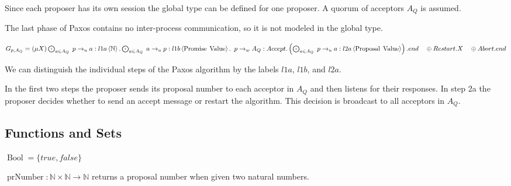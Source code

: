 \newcommand{\Mu}[1]{\left(\mu #1\right)}

\newcommand{\Paren}[1]{\left(#1\right)}

Since each proposer has its own session the global type can be defined for one proposer.
A quorum of acceptors $A_Q$ is assumed.

The last phase of Paxos contains no inter-process communication, so it is not modeled in the global type.

$G_{p, A_Q} = \Mu{X} \DotForall{a \in A_Q} \SendUnreliableG{p}{a}{l1a}{\mathbb{N}} . \DotForall{a \in A_Q} \SendUnreliableG{a}{p}{l1b}{\Promise{\Value}} .\\
\hspace*{0.5em}\SendWeaklyG{p}{A_Q}{\Accept.\Paren{\DotForall{a \in A_Q} \SendUnreliableG{p}{a}{l2a}{\Proposal{\Value}}}.end\\
\hspace*{1em}\oplus \Restart.X\\
\hspace*{1em}\oplus \Abort.end}$

We can distinguish the individual steps of the Paxos algorithm by the labels $l1a$, $l1b$, and $l2a$.

In the first two steps the proposer sends its proposal number to each acceptor in $A_Q$ and then listens for their responses.
In step 2a the proposer decides whether to send an accept message or restart the algorithm.
This decision is broadcast to all acceptors in $A_Q$.

\subsection{Functions and Sets}
\newcommand{\Bool}[0]{\operatorname{Bool}}
\newcommand{\prNumber}[2]{\operatorname{prNumber}\left( #1, #2 \right)}
\newcommand{\promValue}[1]{\operatorname{promValue}\left(#1\right)}
\newcommand{\anyNack}[1]{\operatorname{anyNack}\left(#1\right)}
\newcommand{\promCount}[1]{\operatorname{promCount}\left(#1\right)}
\newcommand{\greaterThan}[2]{\operatorname{gt}\left(#1, #2\right)}
\newcommand{\greaterEqual}[2]{\operatorname{ge}\left(#1, #2\right)}
\newcommand{\nFromPr}[1]{\operatorname{nFromPr}\left(#1 \right)}
\newcommand{\genAq}[3]{\operatorname{genA_Q}\left(#1, #2, #3\right)}

$\Bool = \{ true, false \}$

$\operatorname{prNumber} : \mathbb{N} \times \mathbb{N} \to \mathbb{N}$ returns a proposal number when given two natural numbers.

